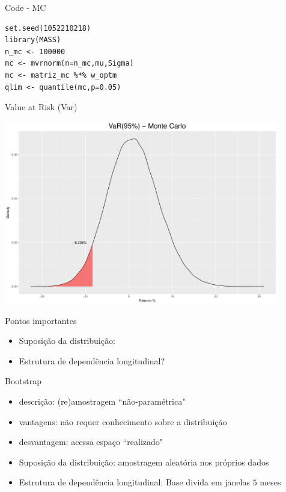 \documentclass{beamer}
\begin{document}
\begin{frame}[fragile]{Code - MC}


\begin{verbatim}
set.seed(1052210218)
library(MASS)
n_mc <- 100000
mc <- mvrnorm(n=n_mc,mu,Sigma)
mc <- matriz_mc %*% w_optm
qlim <- quantile(mc,p=0.05)
   \end{verbatim}
\end{frame}

\begin{frame}{Value at Risk (Var)}

\begin{center}
 \includegraphics[height=8cm,keepaspectratio]{VAR_mc.pdf}
 \end{center}
 
\end{frame}

\begin{frame}{Pontos importantes}
\begin{itemize}
\item Suposição da distribuição:
\item Estrutura de dependência longitudinal?
\end{itemize}
\end{frame}




\begin{frame}{ Bootstrap}


\begin{itemize}
\item descrição: (re)amostragem ``não-paramétrica"
\item vantagens: não requer conhecimento sobre a distribuição
\item desvantagem: acessa espaço ``realizado"
\end{itemize}

\pause

\begin{itemize}
\item Suposição da distribuição: amostragem aleatória nos próprios dados
\item Estrutura de dependência longitudinal: Base divida em janelas $5$ meses
\end{itemize}
 
\end{frame}
\end{document}
